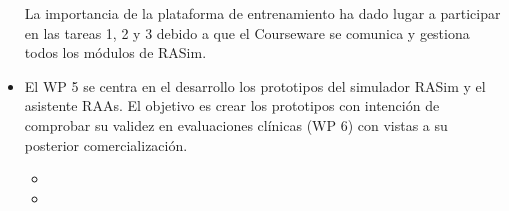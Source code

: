 \begin{itemize}
La importancia de la plataforma de entrenamiento ha dado lugar a participar en las tareas 1, 2 y 3 debido a que el \ac{Courseware} se comunica y gestiona todos los módulos de \ac{RASim}.


\item
El \ac{WP} 5 se centra en el desarrollo los prototipos del simulador \ac{RASim} y el asistente \ac{RAAs}. El objetivo es crear los prototipos con intención de comprobar su validez en evaluaciones clínicas (\ac{WP} 6) con vistas a su posterior comercialización.
\begin{itemize}
    \item {}
     \item {}
\end{itemize}



\end{itemize}
